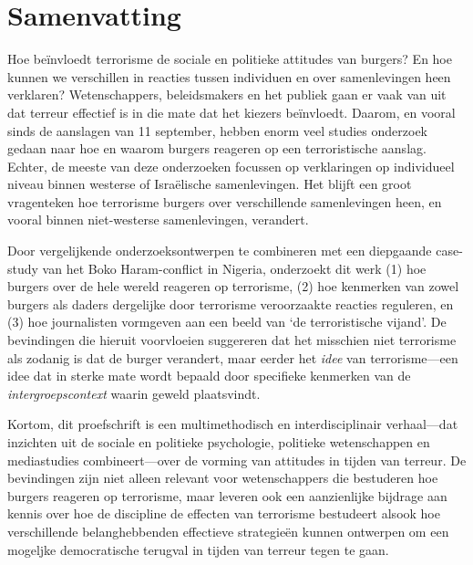 \section*{Samenvatting}
Hoe beïnvloedt terrorisme de sociale en politieke attitudes van burgers? En hoe kunnen we verschillen in reacties tussen individuen en over samenlevingen heen verklaren? Wetenschappers, beleidsmakers en het publiek gaan er vaak van uit dat terreur effectief is in die mate dat het kiezers beïnvloedt. Daarom, en vooral sinds de aanslagen van 11 september, hebben enorm veel studies onderzoek gedaan naar hoe en waarom burgers reageren op een terroristische aanslag. Echter, de meeste van deze onderzoeken focussen op verklaringen op individueel niveau binnen westerse of Israëlische samenlevingen. Het blijft een groot vragenteken hoe terrorisme burgers over verschillende samenlevingen heen, en vooral binnen niet-westerse samenlevingen, verandert.

Door vergelijkende onderzoeksontwerpen te combineren met een diepgaande case-study van het Boko Haram-conflict in Nigeria, onderzoekt dit werk (1) hoe burgers over de hele wereld reageren op terrorisme, (2) hoe kenmerken van zowel burgers als daders dergelijke door terrorisme veroorzaakte reacties reguleren, en (3) hoe journalisten vormgeven aan een beeld van `de terroristische vijand'. De bevindingen die hieruit voorvloeien suggereren dat het misschien niet terrorisme als zodanig is dat de burger verandert, maar eerder het \textit{idee} van terrorisme---een idee dat in sterke mate wordt bepaald door specifieke kenmerken van de \textit{intergroepscontext} waarin geweld plaatsvindt. 


Kortom, dit proefschrift is een multimethodisch en interdisciplinair verhaal---dat inzichten uit de sociale en politieke psychologie, politieke wetenschappen en mediastudies combineert---over de vorming van attitudes in tijden van terreur. De bevindingen zijn niet alleen relevant voor wetenschappers die bestuderen hoe burgers reageren op terrorisme, maar leveren ook een aanzienlijke bijdrage aan kennis over hoe de discipline de effecten van terrorisme bestudeert alsook hoe verschillende belanghebbenden effectieve strategieën kunnen ontwerpen om een mogeljke democratische terugval in tijden van terreur tegen te gaan.
